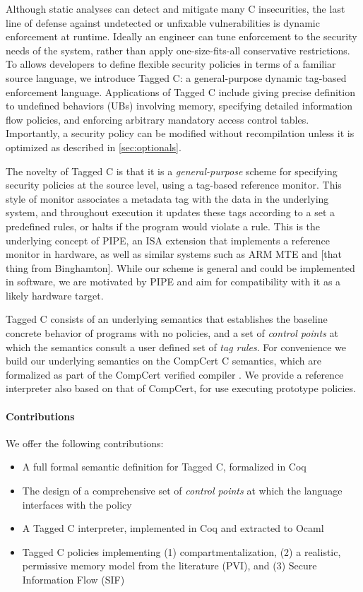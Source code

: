 \documentclass{llncs}
\begin{document}
Although static analyses can detect and mitigate many C insecurities, the last line of defense against
undetected or unfixable vulnerabilities is dynamic enforcement at runtime. Ideally an engineer can
tune enforcement to the security needs of the system, rather than apply one-size-fits-all conservative
restrictions. To allows developers to define flexible security policies in terms of a familiar source language,
we introduce Tagged C: a general-purpose dynamic tag-based enforcement language.
Applications of Tagged C include giving precise definition to undefined behaviors (UBs) involving memory,
specifying detailed information flow policies, and enforcing arbitrary mandatory access control tables.
Importantly, a security policy can be modified without recompilation unless it is optimized as described in
\cref{sec:optionals}.

The novelty of Tagged C is that it is a \emph{general-purpose} scheme for specifying security
policies at the source level, using a tag-based reference monitor.
This style of monitor associates a metadata tag with the data in the underlying system,
and throughout execution it updates these tags according to a set a predefined rules, or halts if
the program would violate a rule. This is the underlying concept of PIPE, an ISA extension that
implements a reference monitor in hardware, as well as similar systems such as ARM MTE and
[that thing from Binghamton]. While our scheme is general and could be implemented in software,
we are motivated by PIPE and aim for compatibility with it as a likely hardware target.

Tagged C consists of an underlying semantics that establishes the baseline concrete behavior of programs
with no policies, and a set of {\em control points} at which the semantics consult a user defined set of
{\em tag rules}. For convenience we build our underlying semantics on the CompCert C semantics, which are formalized 
as part of the CompCert verified compiler \cite{Leroy09:CompCert}. We provide a reference interpreter
also based on that of CompCert, for use executing prototype policies.

\paragraph{Contributions}

We offer the following contributions:

\begin{itemize}
\item A full formal semantic definition for Tagged C, formalized in Coq
\item The design of a comprehensive set of {\em control points} at which the language interfaces with the policy
\item A Tagged C interpreter, implemented in Coq and extracted to Ocaml
\item Tagged C policies implementing (1) compartmentalization,
  (2) a realistic, permissive memory model from the literature (PVI),
  and (3) Secure Information Flow (SIF)
\end{itemize}
\end{document}

